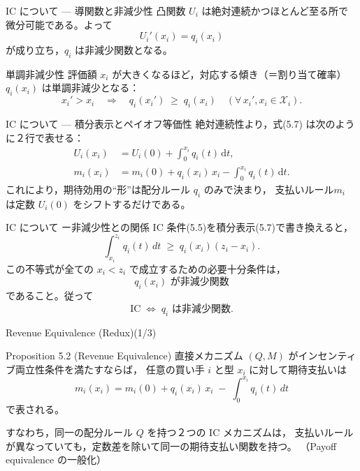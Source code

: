 \documentclass[dvipdfmx,autodetect-engine]{beamer}
\begin{document}
\begin{frame}{IC について — 導関数と非減少性}
  凸関数 $U_i$ は絶対連続かつほとんど至る所で微分可能である。よって
  \begin{equation}
    U_i'(x_i)=q_i(x_i)
    \tag{5.6}
  \end{equation}
  が成り立ち，$q_i$ は\alert{非減少関数}となる。
  \small
  \begin{block}{単調非減少性}
    評価額 \(x_i\) が大きくなるほど，対応する傾き（＝割り当て確率）\(q_i(x_i)\) は単調非減少となる：
    \[
      x_i' > x_i
      \quad\Longrightarrow\quad
      q_i(x_i') \;\ge\; q_i(x_i)
      \quad(\forall\,x_i',x_i\in\mathcal{X}_i).
    \]
  \end{block}
\end{frame}

\begin{frame}{IC について — 積分表示と{ペイオフ等価性}}
  絶対連続性より，式(5.7) は次のように２行で表せる：
  \begin{equation}\tag{5.7}
    \begin{aligned}
      U_i(x_i)
      &= U_i(0)
       + \int_{0}^{x_i} q_i(t)\,\mathrm{d}t,\\
      m_i(x_i)
      &= m_i(0)
       + q_i(x_i)\,x_i
       - \int_{0}^{x_i} q_i(t)\,\mathrm{d}t.
    \end{aligned}
  \end{equation}
  これにより，期待効用の“形”は配分ルール $q_i$ のみで決まり，
  支払いルール$m_i$ は定数 $U_i(0)$ をシフトするだけである。\\[1ex]
\end{frame}


\begin{frame}{IC について ー非減少性との関係}
  IC 条件(5.5)を積分表示(5.7)で書き換えると，
  \[
    \int_{x_i}^{z_i}q_i(t)\,dt \;\ge\; q_i(x_i)(z_i - x_i).
  \]
  この不等式が全ての $x_i<z_i$ で成立するための必要十分条件は，
  \[
    q_i(x_i)\text{ が非減少関数}
  \]
  であること。従って
  \[
    \text{IC}\;\Longleftrightarrow\; q_i\text{ は非減少関数}.
  \]
\end{frame}

\begin{frame}{Revenue Equivalence (Redux)(1/3)}
  \begin{block}{Proposition 5.2 (Revenue Equivalence)}
    直接メカニズム $(Q,M)$ がインセンティブ両立性条件を満たすならば，
    任意の買い手 $i$ と型 $x_i$ に対して期待支払いは
    \[
      m_i(x_i)
      = m_i(0)
      + q_i(x_i)\,x_i
      \;-\;\int_{0}^{x_i}q_i(t)\,dt
      \tag{5.8}
    \]
    で表される。
  \end{block}
  \vspace{1ex}
  すなわち，同一の配分ルール $Q$ を持つ２つの IC メカニズムは，  
  支払いルールが異なっていても，定数差を除いて同一の期待支払い関数を持つ。  
  （Payoff equivalence の一般化）
\end{frame}
\end{document}
